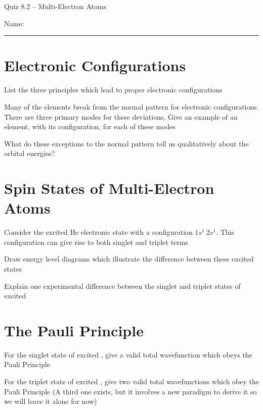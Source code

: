 \documentclass[11pt, letterpaper]{memoir}
\begin{document}
\begin{center}
	{\large Quiz 8.2 -- Multi-Electron Atoms}
\end{center}
{\large Name: \rule[-1mm]{4in}{.1pt}

\section*{Electronic Configurations}
List the three principles which lead to proper electronic configurations

\vspace{5em}\noindent
Many of the elements break from the normal pattern for electronic configurations. There are three primary modes for these deviations. Give an example of an element, with its configuration, for each of these modes

\vspace{7em}\noindent
What do these exceptions to the normal pattern tell us qualitatively about the orbital energies?

\vspace{7em}\noindent
\section*{Spin States of Multi-Electron Atoms}
Consider the excited He electronic state with a configuration $1s^1~2s^1$. This configuration can give rise to both singlet and triplet terms

\noindent Draw energy level diagrams which illustrate the difference between these excited states

\vspace{7em} \noindent
Explain one experimental difference between the singlet and triplet states of excited 

\vspace{7em}
\section*{The Pauli Principle}
For the singlet state of excited , give a valid total wavefunction which obeys the Pauli Principle

\vspace{7em} \noindent
For the triplet state of excited , give two valid total wavefunctions which obey the Pauli Principle (A third one exists, but it involves a new paradigm to derive it so we will leave it alone for now)

\vspace{10em}
}
\end{document}
